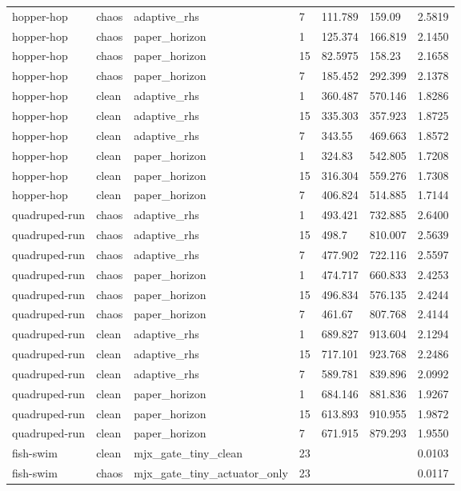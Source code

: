 \begin{tabular}{lllllll}
hopper-hop & chaos & adaptive\_rhs & 7 & 111.789 & 159.09 & 2.5819 \\
hopper-hop & chaos & paper\_horizon & 1 & 125.374 & 166.819 & 2.1450 \\
hopper-hop & chaos & paper\_horizon & 15 & 82.5975 & 158.23 & 2.1658 \\
hopper-hop & chaos & paper\_horizon & 7 & 185.452 & 292.399 & 2.1378 \\
hopper-hop & clean & adaptive\_rhs & 1 & 360.487 & 570.146 & 1.8286 \\
hopper-hop & clean & adaptive\_rhs & 15 & 335.303 & 357.923 & 1.8725 \\
hopper-hop & clean & adaptive\_rhs & 7 & 343.55 & 469.663 & 1.8572 \\
hopper-hop & clean & paper\_horizon & 1 & 324.83 & 542.805 & 1.7208 \\
hopper-hop & clean & paper\_horizon & 15 & 316.304 & 559.276 & 1.7308 \\
hopper-hop & clean & paper\_horizon & 7 & 406.824 & 514.885 & 1.7144 \\
quadruped-run & chaos & adaptive\_rhs & 1 & 493.421 & 732.885 & 2.6400 \\
quadruped-run & chaos & adaptive\_rhs & 15 & 498.7 & 810.007 & 2.5639 \\
quadruped-run & chaos & adaptive\_rhs & 7 & 477.902 & 722.116 & 2.5597 \\
quadruped-run & chaos & paper\_horizon & 1 & 474.717 & 660.833 & 2.4253 \\
quadruped-run & chaos & paper\_horizon & 15 & 496.834 & 576.135 & 2.4244 \\
quadruped-run & chaos & paper\_horizon & 7 & 461.67 & 807.768 & 2.4144 \\
quadruped-run & clean & adaptive\_rhs & 1 & 689.827 & 913.604 & 2.1294 \\
quadruped-run & clean & adaptive\_rhs & 15 & 717.101 & 923.768 & 2.2486 \\
quadruped-run & clean & adaptive\_rhs & 7 & 589.781 & 839.896 & 2.0992 \\
quadruped-run & clean & paper\_horizon & 1 & 684.146 & 881.836 & 1.9267 \\
quadruped-run & clean & paper\_horizon & 15 & 613.893 & 910.955 & 1.9872 \\
quadruped-run & clean & paper\_horizon & 7 & 671.915 & 879.293 & 1.9550 \\
fish-swim & clean & mjx\_gate\_tiny\_clean & 23 &  &  & 0.0103 \\
fish-swim & chaos & mjx\_gate\_tiny\_actuator\_only & 23 &  &  & 0.0117 \\

\end{tabular}
